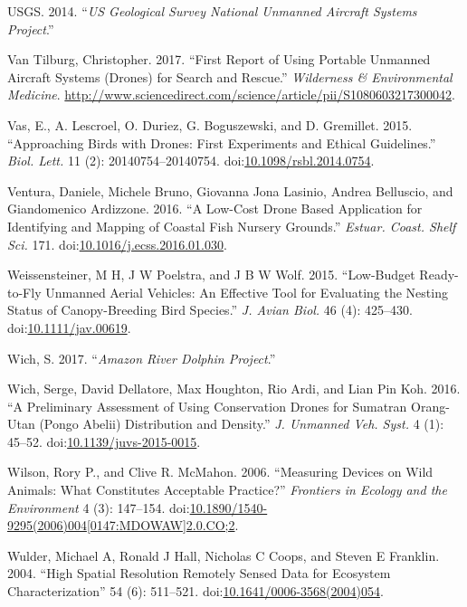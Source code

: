 \documentclass[]{interact}
\theoremstyle{plain}%
\theoremstyle{definition}
\theoremstyle{remark}
\begin{document}
\hypertarget{ref-USGS2014}{}
USGS. 2014. ``\emph{US Geological Survey National Unmanned Aircraft
Systems Project}.''

\hypertarget{ref-van_tilburg_first_2017}{}
Van Tilburg, Christopher. 2017. ``First Report of Using Portable
Unmanned Aircraft Systems (Drones) for Search and Rescue.''
\emph{Wilderness \& Environmental Medicine}.
\url{http://www.sciencedirect.com/science/article/pii/S1080603217300042}.

\hypertarget{ref-vas_approaching_2015}{}
Vas, E., A. Lescroel, O. Duriez, G. Boguszewski, and D. Gremillet. 2015.
``Approaching Birds with Drones: First Experiments and Ethical
Guidelines.'' \emph{Biol. Lett.} 11 (2): 20140754--20140754.
doi:\href{https://doi.org/10.1098/rsbl.2014.0754}{10.1098/rsbl.2014.0754}.

\hypertarget{ref-ventura_low-cost_2016}{}
Ventura, Daniele, Michele Bruno, Giovanna Jona Lasinio, Andrea
Belluscio, and Giandomenico Ardizzone. 2016. ``A Low-Cost Drone Based
Application for Identifying and Mapping of Coastal Fish Nursery
Grounds.'' \emph{Estuar. Coast. Shelf Sci.} 171.
doi:\href{https://doi.org/10.1016/j.ecss.2016.01.030}{10.1016/j.ecss.2016.01.030}.

\hypertarget{ref-weissensteiner_low-budget_2015}{}
Weissensteiner, M H, J W Poelstra, and J B W Wolf. 2015. ``Low-Budget
Ready-to-Fly Unmanned Aerial Vehicles: An Effective Tool for Evaluating
the Nesting Status of Canopy-Breeding Bird Species.'' \emph{J. Avian
Biol.} 46 (4): 425--430.
doi:\href{https://doi.org/10.1111/jav.00619}{10.1111/jav.00619}.

\hypertarget{ref-WichS2017}{}
Wich, S. 2017. ``\emph{Amazon River Dolphin Project}.''

\hypertarget{ref-wich_preliminary_2016}{}
Wich, Serge, David Dellatore, Max Houghton, Rio Ardi, and Lian Pin Koh.
2016. ``A Preliminary Assessment of Using Conservation Drones for
Sumatran Orang-Utan (Pongo Abelii) Distribution and Density.'' \emph{J.
Unmanned Veh. Syst.} 4 (1): 45--52.
doi:\href{https://doi.org/10.1139/juvs-2015-0015}{10.1139/juvs-2015-0015}.

\hypertarget{ref-wilson_measuring_2006}{}
Wilson, Rory P., and Clive R. McMahon. 2006. ``Measuring Devices on Wild
Animals: What Constitutes Acceptable Practice?'' \emph{Frontiers in
Ecology and the Environment} 4 (3): 147--154.
doi:\href{https://doi.org/10.1890/1540-9295(2006)004\%5B0147:MDOWAW\%5D2.0.CO;2}{10.1890/1540-9295(2006)004{[}0147:MDOWAW{]}2.0.CO;2}.

\hypertarget{ref-wulder_high_2004}{}
Wulder, Michael A, Ronald J Hall, Nicholas C Coops, and Steven E
Franklin. 2004. ``High Spatial Resolution Remotely Sensed Data for
Ecosystem Characterization'' 54 (6): 511--521.
doi:\href{https://doi.org/10.1641/0006-3568(2004)054}{10.1641/0006-3568(2004)054}.
\end{document}
